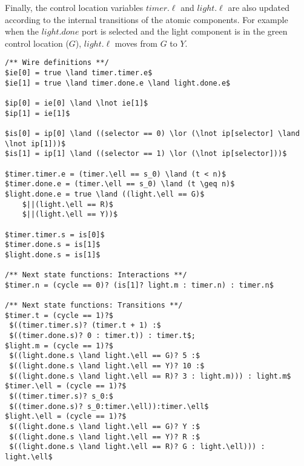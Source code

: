 Finally, the control location variables $timer.\ell$ and 
$light.\ell$ are also updated according to the internal transitions of the 
atomic components. For example when the $light.done$ port is selected
and the light component is in the green control location ($G$), 
 $light.\ell$ moves from $G$ to $Y$. 

\begin{lstlisting}[caption=Sample of \biptool{} generated code,label=sample:code:bip,float=bt]
/** Wire definitions **/
$ie[0] = true \land timer.timer.e$
$ie[1] = true \land timer.done.e \land light.done.e$

$ip[0] = ie[0] \land \lnot ie[1]$
$ip[1] = ie[1]$

$is[0] = ip[0] \land ((selector == 0) \lor (\lnot ip[selector] \land \lnot ip[1]))$
$is[1] = ip[1] \land ((selector == 1) \lor (\lnot ip[selector]))$

$timer.timer.e = (timer.\ell == s_0) \land (t < n)$
$timer.done.e = (timer.\ell == s_0) \land (t \geq n)$
$light.done.e = true \land ((light.\ell == G)$ 
    $||(light.\ell == R)$
    $||(light.\ell == Y))$
    
$timer.timer.s = is[0]$
$timer.done.s = is[1]$
$light.done.s = is[1]$

/** Next state functions: Interactions **/
$timer.n = (cycle == 0)? (is[1]? light.m : timer.n) : timer.n$

/** Next state functions: Transitions **/
$timer.t = (cycle == 1)?$ 
 $((timer.timer.s)? (timer.t + 1) :$
 $((timer.done.s)? 0 : timer.t)) : timer.t$;
$light.m = (cycle == 1)?$
 $((light.done.s \land light.\ell == G)? 5 :$
 $((light.done.s \land light.\ell == Y)? 10 :$
 $((light.done.s \land light.\ell == R)? 3 : light.m))) : light.m$
$timer.\ell = (cycle == 1)?$
 $((timer.timer.s)? s_0:$
 $((timer.done.s)? s_0:timer.\ell)):timer.\ell$
$light.\ell = (cycle == 1)?$
 $((light.done.s \land light.\ell == G)? Y :$
 $((light.done.s \land light.\ell == Y)? R :$
 $((light.done.s \land light.\ell == R)? G : light.\ell))) : light.\ell$
\end{lstlisting}
%
